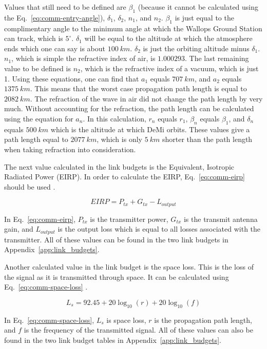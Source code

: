 \documentclass[12pt]{article}
\begin{document}
Values that still need to be defined are $\beta_1$ (because it cannot be calculated using the Eq.~\ref{eq:comm-entry-angle}), $\delta_1$, $\delta_2$, $n_1$, and $n_2$. $\beta_1$ is just equal to the complimentary angle to the minimum angle at which the Wallops Ground Station can track, which is $5^\circ$. $\delta_1$ will be equal to the altitude at which the atmosphere ends which one can say is about $100\ km$. $\delta_2$ is just the orbiting altitude minus $\delta_1$. $n_1$, which is simple the refractive index of air, is $1.000293$. The last remaining value to be defined is $n_2$, which is the refractive index of a vacuum, which is just 1. Using these equations, one can find that $a_1$ equals $707\ km$, and $a_2$ equals $1375\ km$. This means that the worst case propagation path length is equal to $2082\ km$. The refraction of the wave in air did not change the path length by very much. Without accounting for the refraction, the path length can be calculated using the equation for $a_n$. In this calculation, $r_n$ equals $r_1$, $\beta_n$ equals $\beta_1$, and $\delta_n$ equals $500\ km$ which is the altitude at which DeMi orbits. These values give a path length equal to $2077\ km$, which is only $5\ km$ shorter than the path length when taking refraction into consideration.

The next value calculated in the link budgets is the Equivalent, Isotropic Radiated Power (EIRP). In order to calculate the EIRP, Eq.~\ref{eq:comm-eirp} should be used \cite[p.~476]{SMAD}.

\begin{equation}\label{eq:comm-eirp}
EIRP = P_{tx} + G_{tx} - L_{output} 
\end{equation}

In Eq.~\ref{eq:comm-eirp}, $P_{tx}$ is the transmitter power, $G_{tx}$ is the transmit antenna gain, and $L_{output}$ is the output loss which is equal to all losses associated with the transmitter. All of these values can be found in the two link budgets in Appendix~\ref{app:link_budgets}.

Another calculated value in the link budget is the space loss. This is the loss of the signal as it is transmitted through space. It can be calculated using Eq.~\ref{eq:comm-space-loss} \cite[p.~476]{SMAD}.

\begin{equation}\label{eq:comm-space-loss}
L_s = 92.45 + 20\log_{10}(r) + 20\log_{10}(f) 
\end{equation}

In Eq.~\ref{eq:comm-space-loss}, $L_s$ is space loss, $r$ is the propagation path length, and $f$ is the frequency of the transmitted signal. All of these values can also be found in the two link budget tables in Appendix~\ref{app:link_budgets}.
\end{document}
